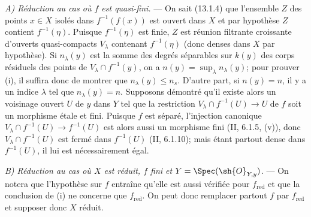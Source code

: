 \emph{A) Réduction au cas où $f$ est quasi-fini.} --- On sait (13.1.4) que l'ensemble $Z$ des points $x\in X$ isolés dans $f^{-1}(f(x))$ est ouvert dans $X$ et par hypothèse $Z$ contient $f^{-1}(\eta)$. Puisque $f^{-1}(\eta)$ est finie, $Z$ est réunion filtrante croissante d'ouverts quasi-compacts $V_\lambda$ contenant $f^{-1}(\eta)$ (donc denses dans $X$ par hypothèse). Si $n_\lambda(y)$ est la somme des degrés séparables sur $k(y)$ des corps résiduels des points de $V_\lambda\cap f^{-1}(y)$, on a $n(y)=\sup_\lambda n_\lambda(y)$; pour prouver (i), il suffira donc de montrer que $n_\lambda(y)\leq n_s$. D'autre part, si $n(y)=n$, il y a un indice $\lambda$ tel que $n_\lambda(y)=n$. Supposons démontré qu'il existe alors un voisinage ouvert $U$ de $y$ dans $Y$ tel que la restriction $V_\lambda\cap f^{-1}(U)\to U$ de $f$ soit un morphisme étale et fini. Puisque $f$ est séparé, l'injection canonique $V_\lambda\cap f^{-1}(U)\to f^{-1}(U)$ est alors aussi un morphisme fini (II, 6.1.5, (v)), donc $V_\lambda\cap f^{-1}(U)$ est fermé dans $f^{-1}(U)$ (II, 6.1.10); mais étant partout dense dans $f^{-1}(U)$, il lui est nécessairement égal.

\emph{B) Réduction au cas où $X$ est réduit, $f$ fini et $Y=\Spec(\sh{O}_{Y,y})$.} --- On notera que l'hypothèse sur $f$ entraîne qu'elle est aussi vérifiée pour $f_{\mathrm{red}}$ et que la conclusion de (i) ne concerne que $f_{\mathrm{red}}$. On peut donc remplacer partout $f$ par $f_{\mathrm{red}}$ et supposer donc $X$ réduit.


